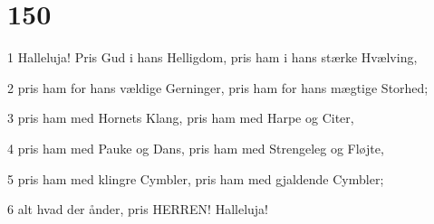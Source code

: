 \chapter{150}

\par 1 Halleluja! Pris Gud i hans Helligdom, pris ham i hans stærke Hvælving,
\par 2 pris ham for hans vældige Gerninger, pris ham for hans mægtige Storhed;
\par 3 pris ham med Hornets Klang, pris ham med Harpe og Citer,
\par 4 pris ham med Pauke og Dans, pris ham med Strengeleg og Fløjte,
\par 5 pris ham med klingre Cymbler, pris ham med gjaldende Cymbler;
\par 6 alt hvad der ånder, pris HERREN! Halleluja!


